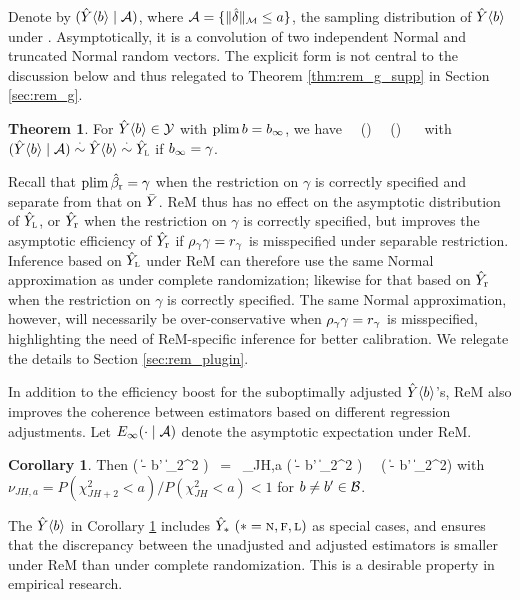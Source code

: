\documentclass[11pt]{article}
\theoremstyle{definition}
\newtheorem{theorem}{Theorem}
\newtheorem{corollary}{Corollary}
\begin{document}
Denote by $(\hat Y\langle b \rangle\mid \mathcal{A})$, where $\ma = \{\remd\}$, the sampling distribution of $\hat Y\langle b \rangle$ under {\rem}. 
Asymptotically, it is a convolution of  two independent  Normal and truncated Normal random vectors. The explicit form is not central to the discussion below and thus relegated to Theorem \ref{thm:rem_g_supp} in Section \ref{sec:rem_g}. 
 





\begin{theorem}\label{thm:rem_g}
{\prerem}
For $\hat Y\langle b \rangle\in \mathcal{Y}$ with $\textup{plim\,} b = b_\infty$, we have 
\begina
 \hyl \ \asim \ (\hyl \mid \ma) \ \succi \ (\hyba\mid \ma)  \ \succi\  \hyba
\enda
with $(\hat Y\langle b \rangle\mid \mathcal{A}) \overset{\cdot}{\sim} \hat Y\langle b \rangle\overset{\cdot}{\sim} \hat Y_{\textsc{l}}$ if $b_\infty = \gamma$.
\end{theorem}



Recall that $\textup{plim\,} \hat\beta_{\textup{r}} = \gamma$ when the restriction on $\gamma$ is correctly specified and separate from that on $\bar Y$. 
ReM thus has no effect on the asymptotic distribution of $\hat Y_{\textsc{l}}$, or $\hat Y_{\textup{r}}$ when the restriction on $\gamma$ is correctly specified, but improves the asymptotic efficiency of $\hat Y_{\textup{r}}$ if $\rho_\gamma\gamma = r_\gamma$ is misspecified under separable restriction.
Inference based on $\hat Y_{\textsc{l}}$ under ReM can therefore use the same Normal approximation as under complete randomization; likewise for that based on $\hat Y_{\textup{r}}$ when the restriction on $\gamma$ is correctly specified.
The same Normal approximation, however, will necessarily be over-conservative when $\rho_\gamma\gamma = r_\gamma$ is misspecified, highlighting the need of ReM-specific inference for better calibration. 
We relegate the details to Section \ref{sec:rem_plugin}.

In addition to the efficiency boost for the suboptimally adjusted $\hat Y\langle b \rangle$'s, ReM also improves the coherence between estimators based on different regression adjustments. 
Let $E_\infty(\cdot\mid \mathcal{A})$ denote the asymptotic expectation under ReM.
\begin{corollary}\label{cor:close}
{\prerem} Then 
\begina
 \ei \big( \|\hyba - \hy\la b' \ra \|_2^2  \mid  \ma \big ) 
\ = \  \nu_{JH,a}   \ei\big( \|\hyba - \hy\la b' \ra \|_2^2  \big) 
\    \leq \     \ei \big( \|\hyba - \hy\la b' \ra \|_2^2\big)
\enda
  with $ \nu_{JH, a} =  P(\chi^2_{JH+2}< a)/P(\chi^2_{JH}< a) < 1$ for $b \neq b' \in \mathcal{B}$.  
\end{corollary}


The $\hat Y\langle b \rangle$ in Corollary \ref{cor:close} includes $\hat Y_* \ (* =\textsc{n}, \textsc{f}, \textsc{l})$ as special cases, and ensures that the discrepancy between the unadjusted and adjusted estimators is smaller under ReM than under complete randomization. This is a desirable property in empirical research. 
\end{document}
